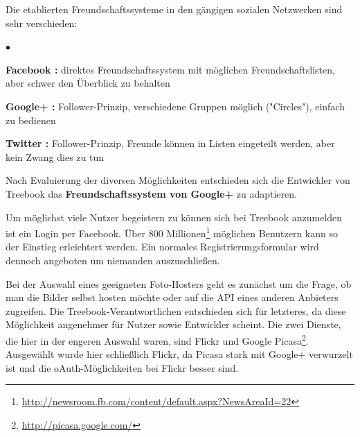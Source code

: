 \documentclass[10pt,a4paper]{book}
\begin{document}
Die etablierten Freundschaftssysteme in den gängigen sozialen Netzwerken sind sehr verschieden:
\begin{list}{$\bullet$}{}
\item \textbf{Facebook :} direktes Freundschaftssystem mit möglichen Freundschaftslisten, aber schwer den Überblick zu behalten
\item \textbf{Google+ :} Follower-Prinzip, verschiedene Gruppen möglich ("Circles"), einfach zu bedienen
\item \textbf{Twitter :} Follower-Prinzip, Freunde können in Listen eingeteilt werden, aber kein Zwang dies zu tun
\end{list}
Nach Evaluierung der diversen Möglichkeiten entschieden sich die Entwickler von Treebook das \textbf{Freundschaftssystem von Google+} zu adaptieren.

Um möglichst viele Nutzer begeistern zu können sich bei Treebook anzumelden  ist ein Login per Facebook. Über 800 Millionen\footnote{\href{http://newsroom.fb.com/content/default.aspx?NewsAreaId=22}{http://newsroom.fb.com/content/default.aspx?NewsAreaId=22}} möglichen Benutzern kann so der Einstieg erleichtert werden. Ein normales Registrierungsformular wird dennoch angeboten um niemanden auszuschließen.

Bei der Auswahl eines geeigneten Foto-Hosters geht es zunächst um die Frage, ob man die Bilder selbst hosten möchte oder auf die API eines anderen Anbieters zugreifen. Die Treebook-Verantwortlichen entschieden sich für letzteres, da diese Möglichkeit angenehmer für Nutzer sowie Entwickler scheint. Die zwei Dienste, die hier in der engeren Auswahl waren, sind Flickr und Google Picasa\footnote{\href{http://picasa.google.com/}{http://picasa.google.com/}}. Ausgewählt wurde hier schließlich Flickr, da Picasa stark mit Google+ verwurzelt ist und die oAuth-Möglichkeiten bei Flickr besser sind.  
\end{document}
